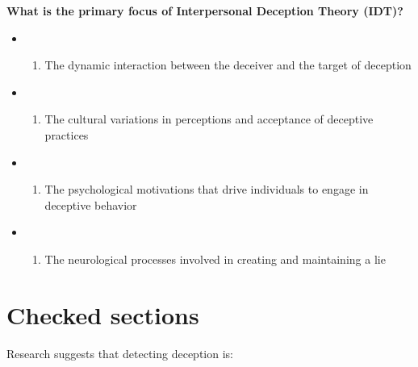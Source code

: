 \documentclass[
  letterpaper,
  DIV=11,
  numbers=noendperiod]{scrreprt}
\providecommand{\tightlist}{%
  \setlength{\itemsep}{0pt}\setlength{\parskip}{0pt}}\usepackage{longtable,booktabs,array}
\begin{document}
\textbf{What is the primary focus of Interpersonal Deception Theory
(IDT)?}

\begin{itemize}
\tightlist
\item
  \begin{enumerate}
  \def\labelenumi{(\Alph{enumi})}
  \tightlist
  \item
    The dynamic interaction between the deceiver and the target of
    deception\\
  \end{enumerate}
\item
  \begin{enumerate}
  \def\labelenumi{(\Alph{enumi})}
  \setcounter{enumi}{1}
  \tightlist
  \item
    The cultural variations in perceptions and acceptance of deceptive
    practices\\
  \end{enumerate}
\item
  \begin{enumerate}
  \def\labelenumi{(\Alph{enumi})}
  \setcounter{enumi}{2}
  \tightlist
  \item
    The psychological motivations that drive individuals to engage in
    deceptive behavior\\
  \end{enumerate}
\item
  \begin{enumerate}
  \def\labelenumi{(\Alph{enumi})}
  \setcounter{enumi}{3}
  \tightlist
  \item
    The neurological processes involved in creating and maintaining a
    lie
  \end{enumerate}
\end{itemize}

\section{Checked sections}\label{checked-sections-1}

Research suggests that detecting deception is:
\end{document}

